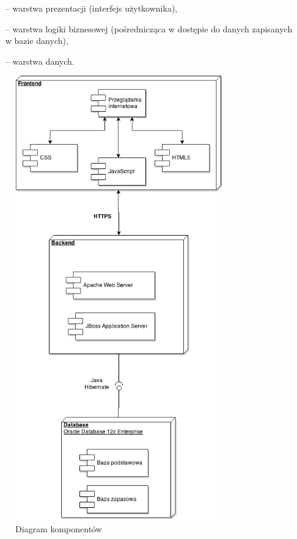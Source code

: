\begin{itemize}
	\item[--] warstwa prezentacji (interfejs użytkownika),
	\item[--] warstwa logiki biznesowej (pośrednicząca w dostępie do danych zapisanych w bazie danych),
	\item[--] warstwa danych.
\end{itemize}

\begin{figure}[h]
	\centering
	\includegraphics[width=0.8\textwidth]{img/components}
	\caption{Diagram komponentów \label{fig:labelComponents}}
\end{figure}


